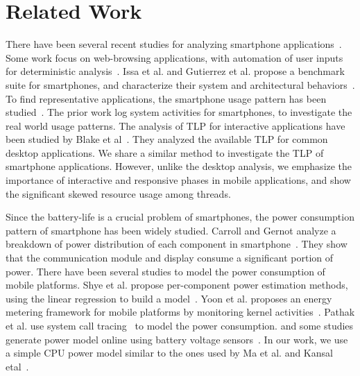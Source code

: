 \chapter{Related Work}

There have been several recent studies for analyzing smartphone applications~\cite{characterinteractive, tmapp, anatomizing, WhySlowBrowser}.
Some work focus on web-browsing applications, with automation of user inputs for deterministic analysis~\cite{anatomizing, WhySlowBrowser}.
Issa et al. and Gutierrez et al. propose a benchmark suite for smartphones,
and characterize their system and architectural behaviors~\cite{characterinteractive, tmapp}. 
To find representative applications, the smartphone usage pattern has been studied~\cite{diversity,intothewild,diversebehavior}.
The prior work log system activities for smartphones, to investigate the real world usage patterns.
The analysis of TLP for interactive applications have been studied by Blake et al~\cite{desktopTLP}. They
analyzed the available TLP for common desktop applications. We share a similar method to
investigate the TLP of smartphone applications. However, unlike the desktop analysis,
we emphasize the importance of interactive and responsive phases in mobile applications,
and show the significant skewed resource usage among threads.

Since the battery-life is a crucial problem of smartphones,
the power consumption pattern of smartphone has been widely studied.
Carroll and Gernot analyze a breakdown of power distribution of each component in smartphone~\cite{smartphonepower}.
They show that the communication module and display consume a significant portion of power.
There have been several studies to model the power consumption of mobile platforms.
Shye et al.  propose per-component power estimation methods, using the linear regression to build a model~\cite{intothewild}.
Yoon et al. proposes an energy metering framework for mobile platforms by monitoring kernel activities~\cite{AppScope}.
Pathak et al. use system call tracing~\cite{powermodelsyscall} to model the power consumption.
and some studies generate power model online using battery voltage sensors~\cite{selfconstructive, accurateonline}. 
In our work, we use a simple CPU power model similar to the ones used by Ma et al. and Kansal etal~\cite{VMpower, isca11DVFS}.

